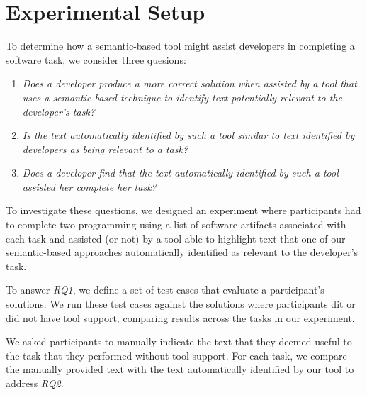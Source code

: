 \clearpage

\section{Experimental Setup}
\label{cp6:procedures}



To determine how a semantic-based tool might assist developers in completing a software task, we consider three quesions:



\begin{enumerate}
\item \textit{Does a developer produce a more correct solution when assisted by a tool that uses a semantic-based technique to identify text potentially relevant to the developer's task?}
\item \textit{Is the text automatically identified by such a tool similar to text identified by developers as being relevant to a task?}  
\item \textit{Does a developer find that the text automatically identified by such a tool assisted her complete her task?}
\end{enumerate}
    


To investigate these questions, we designed an experiment where participants had to complete two programming
using a list of software artifacts associated with each task
and assisted (or not) by a tool able to highlight text that one of our semantic-based approaches automatically identified as relevant to the developer's task. 

 




To answer \textit{RQ1}, we define a set of test cases that evaluate a participant's solutions. 
We run these test cases against the solutions where participants dit or did not have tool support, comparing results 
across the tasks in our experiment.


We asked participants to manually indicate the text that they deemed useful to the task
that they performed without tool support.
For each task, we compare the manually provided text with the text automatically identified by our tool to address \textit{RQ2}.














